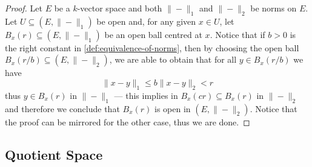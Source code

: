 \begin{proof}
Let \(E\) be a \(k\)-vector space and both \(\| - \|_1\) and \(\| - \|_2\) be
norms on \(E\). Let \(U \subseteq (E, \| - \|_1)\) be open and, for any given
\(x \in U\), let \(B_x(r) \subseteq (E, \| - \|_1)\) be an open ball centred at
\(x\). Notice that if \(b > 0\) is the right constant in
\cref{def:equivalence-of-norms}, then by choosing the open ball \(B_x(r/b)
\subseteq (E, \| - \|_2)\), we are able to obtain that for all \(y \in
B_x(r/b)\) we have
\[
\| x - y \|_1 \leq b \| x - y \|_2 < r
\]
thus \(y \in B_x(r)\) in \(\| - \|_1\) --- this implies in \(B_x(c r) \subseteq
B_x(r)\) in \(\| - \|_2\) and therefore we conclude that \(B_x(r)\) is open in
\((E, \| - \|_2)\). Notice that the proof can be mirrored for the other case,
thus we are done.
\end{proof}

\subsection{Quotient Space}

